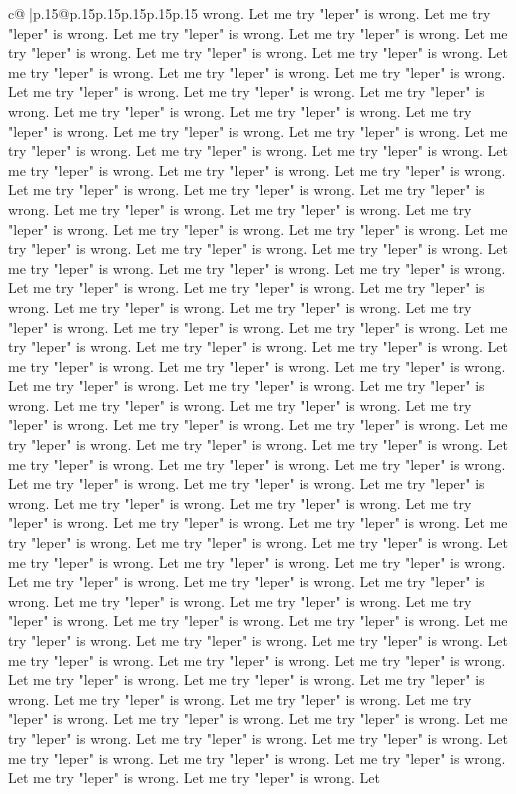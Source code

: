 \documentclass{article}
\begin{document}
{\begin{supertabular}{c@{$\;$}|p{.15\linewidth}@{}p{.15\linewidth}p{.15\linewidth}p{.15\linewidth}p{.15\linewidth}p{.15\linewidth}}
{{{wrong. Let me try "leper" is wrong. Let me try "leper" is wrong. Let me try "leper" is wrong. Let me try "leper" is wrong. Let me try "leper" is wrong. Let me try "leper" is wrong. Let me try "leper" is wrong. Let me try "leper" is wrong. Let me try "leper" is wrong. Let me try "leper" is wrong. Let me try "leper" is wrong. Let me try "leper" is wrong. Let me try "leper" is wrong. Let me try "leper" is wrong. Let me try "leper" is wrong. Let me try "leper" is wrong. Let me try "leper" is wrong. Let me try "leper" is wrong. Let me try "leper" is wrong. Let me try "leper" is wrong. Let me try "leper" is wrong. Let me try "leper" is wrong. Let me try "leper" is wrong. Let me try "leper" is wrong. Let me try "leper" is wrong. Let me try "leper" is wrong. Let me try "leper" is wrong. Let me try "leper" is wrong. Let me try "leper" is wrong. Let me try "leper" is wrong. Let me try "leper" is wrong. Let me try "leper" is wrong. Let me try "leper" is wrong. Let me try "leper" is wrong. Let me try "leper" is wrong. Let me try "leper" is wrong. Let me try "leper" is wrong. Let me try "leper" is wrong. Let me try "leper" is wrong. Let me try "leper" is wrong. Let me try "leper" is wrong. Let me try "leper" is wrong. Let me try "leper" is wrong. Let me try "leper" is wrong. Let me try "leper" is wrong. Let me try "leper" is wrong. Let me try "leper" is wrong. Let me try "leper" is wrong. Let me try "leper" is wrong. Let me try "leper" is wrong. Let me try "leper" is wrong. Let me try "leper" is wrong. Let me try "leper" is wrong. Let me try "leper" is wrong. Let me try "leper" is wrong. Let me try "leper" is wrong. Let me try "leper" is wrong. Let me try "leper" is wrong. Let me try "leper" is wrong. Let me try "leper" is wrong. Let me try "leper" is wrong. Let me try "leper" is wrong. Let me try "leper" is wrong. Let me try "leper" is wrong. Let me try "leper" is wrong. Let me try "leper" is wrong. Let me try "leper" is wrong. Let me try "leper" is wrong. Let me try "leper" is wrong. Let me try "leper" is wrong. Let me try "leper" is wrong. Let me try "leper" is wrong. Let me try "leper" is wrong. Let me try "leper" is wrong. Let me try "leper" is wrong. Let me try "leper" is wrong. Let me try "leper" is wrong. Let me try "leper" is wrong. Let me try "leper" is wrong. Let me try "leper" is wrong. Let me try "leper" is wrong. Let me try "leper" is wrong. Let me try "leper" is wrong. Let me try "leper" is wrong. Let me try "leper" is wrong. Let me try "leper" is wrong. Let me try "leper" is wrong. Let me try "leper" is wrong. Let me try "leper" is wrong. Let me try "leper" is wrong. Let me try "leper" is wrong. Let me try "leper" is wrong. Let me try "leper" is wrong. Let me try "leper" is wrong. Let me try "leper" is wrong. Let me try "leper" is wrong. Let me try "leper" is wrong. Let me try "leper" is wrong. Let me try "leper" is wrong. Let me try "leper" is wrong. Let me try "leper" is wrong. Let me try "leper" is wrong. Let me try "leper" is wrong. Let me try "leper" is wrong. Let me try "leper" is wrong. Let me try "leper" is wrong. Let me try "leper" is wrong. Let me try "leper" is wrong. Let me try "leper" is wrong. Let me try "leper" is wrong. Let }}}
\end{supertabular}}
\end{document}
